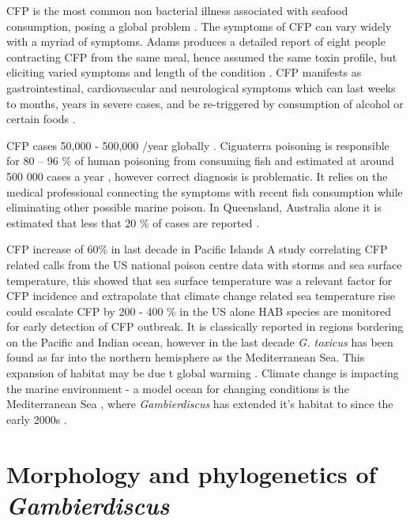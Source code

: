 \documentclass[12pt]{article}
\begin{document}
CFP is the most common non bacterial illness associated with seafood consumption, posing a global problem \cite{friedman2008ciguatera}. %
The symptoms of CFP can vary widely with a myriad of symptoms. Adams produces a detailed report of eight people contracting CFP from the same meal, hence assumed the same toxin profile, but eliciting varied symptoms and length of the condition \cite{adams1993outbreak}. %
CFP manifests as gastrointestinal, cardiovascular and neurological symptoms which can last weeks to months, years in severe cases, and be re-triggered by consumption of alcohol or certain foods \cite{lewis2006ciguatera}.

CFP cases 50,000 - 500,000 /year globally \cite{fleming1998seafood}.
Ciguaterra poisoning is responsible for 80 – 96 \% of human poisoning from consuming fish and estimated at around 500 000 cases a year \cite{grandjean2008centers}, however correct diagnosis is problematic. It relies on the medical professional connecting the symptoms with recent fish consumption while eliminating other possible marine poison. In Queensland, Australia alone it is estimated that less that 20 \% of cases are reported \cite{lewis2006ciguatera}.
 
CFP increase of 60\% in last decade in Pacific Islands \cite{skinner2011ciguatera}
A study correlating CFP related calls from the US national poison centre data with storms and sea surface temperature, this showed that sea surface temperature was a relevant factor for CFP incidence and extrapolate that climate change related sea temperature rise could escalate CFP by 200 - 400 \% in the US alone \cite{garces2012habitat}
HAB species are monitored for early detection of CFP outbreak.
It is classically reported in regions bordering on the Pacific and Indian ocean, however in the last decade \emph{G. toxicus} has been found as far into the northern hemisphere as the Mediterranean Sea. This expansion of habitat may be due t global warming \cite{aligizaki2008morphological}.
Climate change is impacting the marine environment - a model ocean for changing conditions is the Mediterranean Sea \cite{lejeusne2010climate}, where \emph{Gambierdiscus} has extended it's habitat to since the early 2000s \cite{aligizaki2008morphological}.

\section{Morphology and phylogenetics of \emph{Gambierdiscus}}
\end{document}
